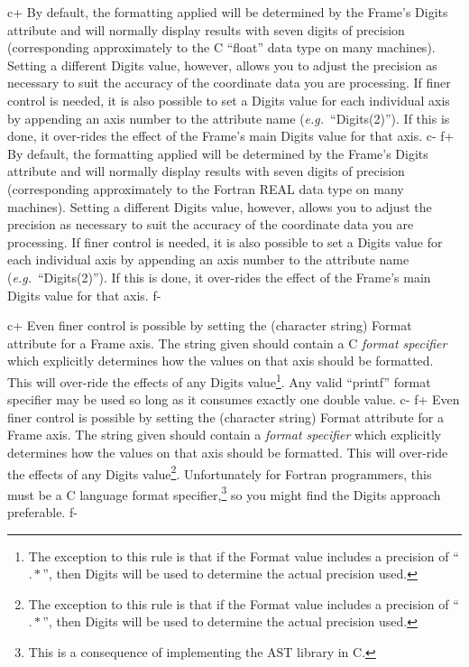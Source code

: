 \documentclass[twoside,11pt]{article}
\begin{document}
c+
By default, the formatting applied will be determined by the Frame's
Digits attribute and will normally display results with seven digits
of precision (corresponding approximately to the C ``float'' data type
on many machines). Setting a different Digits value, however, allows
you to adjust the precision as necessary to suit the accuracy of the
coordinate data you are processing.  If finer control is needed, it is
also possible to set a Digits value for each individual axis by
appending an axis number to the attribute name
({\em{e.g.}}\ ``Digits(2)''). If this is done, it over-rides the
effect of the Frame's main Digits value for that axis.
c-
f+
By default, the formatting applied will be determined by the Frame's
Digits attribute and will normally display results with seven digits
of precision (corresponding approximately to the Fortran REAL data
type on many machines). Setting a different Digits value, however,
allows you to adjust the precision as necessary to suit the accuracy
of the coordinate data you are processing.  If finer control is
needed, it is also possible to set a Digits value for each individual
axis by appending an axis number to the attribute name
({\em{e.g.}}\ ``Digits(2)''). If this is done, it over-rides the
effect of the Frame's main Digits value for that axis.
f-

c+
Even finer control is possible by setting the (character string) Format
attribute for a Frame axis. The string given should contain a C
{\em{format specifier}} which explicitly determines how the values on
that axis should be formatted. This will over-ride the effects of any
Digits value\footnote{The exception to this rule is that if the Format
value includes a precision of ``$.*$'', then Digits will be used to
determine the actual precision used.}. Any valid ``printf'' format
specifier may be used so long as it consumes exactly one double value.
c-
f+
Even finer control is possible by setting the (character string)
Format attribute for a Frame axis. The string given should contain a
{\em{format specifier}} which explicitly determines how the values on
that axis should be formatted. This will over-ride the effects of any
Digits value\footnote{The exception to this rule is that if the Format value 
includes a precision of ``$.*$'', then Digits will be used to determine 
the actual precision used.}.  Unfortunately for Fortran programmers, this must 
be a C language format specifier,\footnote{This is a consequence of
implementing the AST library in C.} so you might find the Digits
approach preferable.
f-
\end{document}
